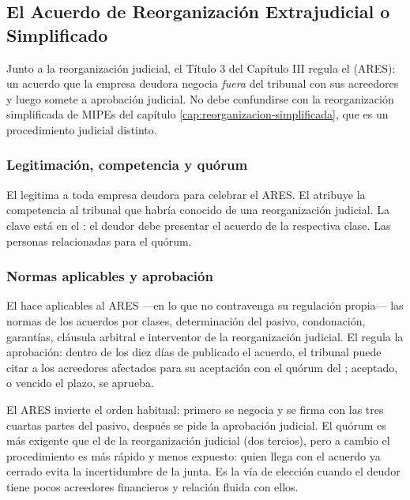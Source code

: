 \subsection{El Acuerdo de Reorganización Extrajudicial o Simplificado}

Junto a la reorganización judicial, el Título 3 del Capítulo III regula el  (ARES): un acuerdo que la empresa deudora negocia
\emph{fuera} del tribunal con sus acreedores y luego somete a aprobación judicial. No debe
confundirse con la reorganización simplificada de MIPEs del capítulo
\ref{cap:reorganizacion-simplificada}, que es un procedimiento judicial distinto.

\subsubsection{Legitimación, competencia y quórum}

El  legitima a toda empresa deudora para celebrar el ARES. El  atribuye la
competencia al tribunal que habría conocido de una reorganización judicial. La clave está en el
: el deudor debe presentar el acuerdo  de la respectiva clase. Las personas
relacionadas  para el quórum.

\subsubsection{Normas aplicables y aprobación}

El  hace aplicables al ARES ---en lo que no contravenga su regulación propia--- las
normas de los acuerdos por clases, determinación del pasivo, condonación, garantías, cláusula
arbitral e interventor de la reorganización judicial. El  regula la aprobación: dentro
de los diez días de publicado el acuerdo, el tribunal puede citar a los acreedores afectados
para su aceptación con el quórum del ; aceptado, o vencido el plazo, se aprueba.

\begin{foco}
El ARES invierte el orden habitual: primero se negocia y se firma con las tres cuartas partes
del pasivo, después se pide la aprobación judicial. El quórum es más exigente que el de la
reorganización judicial (dos tercios), pero a cambio el procedimiento es más rápido y menos
expuesto: quien llega con el acuerdo ya cerrado evita la incertidumbre de la junta. Es la vía de
elección cuando el deudor tiene pocos acreedores financieros y relación fluida con ellos.
\end{foco}

